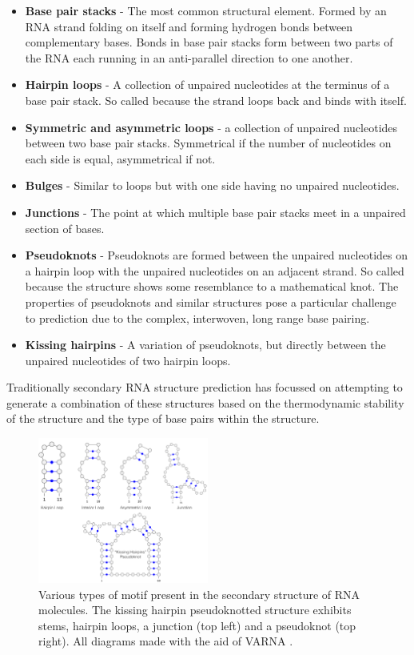 \documentclass[journal]{IEEEtran}
\begin{document}
\begin{itemize}
	\item \textbf{Base pair stacks} - The most common structural element. Formed by an RNA strand folding on itself and forming hydrogen bonds between complementary bases. Bonds in base pair stacks form between two parts of the RNA each running in an anti-parallel direction to one another. 
	\item \textbf{Hairpin loops} - A collection of unpaired nucleotides at the terminus of a base pair stack. So called because the strand loops back and binds with itself.
	\item \textbf{Symmetric and asymmetric loops} - a collection of unpaired nucleotides between two base pair stacks. Symmetrical if the number of nucleotides on each side is equal, asymmetrical if not.
	\item \textbf{Bulges} - Similar to loops but with one side having no unpaired nucleotides.
	\item \textbf{Junctions} - The point at which multiple base pair stacks meet in a unpaired section of bases.
	\item \textbf{Pseudoknots} - Pseudoknots are formed between the unpaired nucleotides on a hairpin loop with the unpaired nucleotides on an adjacent strand. So called because the structure shows some resemblance to a mathematical knot. The properties of pseudoknots and similar structures pose a particular challenge to prediction due to the complex, interwoven, long range base pairing.
	\item \textbf{Kissing hairpins} - A variation of pseudoknots, but directly between the unpaired nucleotides of two hairpin loops.
\end{itemize}

Traditionally secondary RNA structure prediction has focussed on attempting to generate a combination of these structures based on the thermodynamic stability of the structure and the type of base pairs within the structure.

\begin{figure}[t]
\centering
\includegraphics[width=0.5\textwidth]{img/secondary_structure_types.png}
\caption{Various types of motif present in the secondary structure of RNA molecules. The kissing hairpin pseudoknotted structure exhibits stems, hairpin loops, a junction (top left) and a pseudoknot (top right). All diagrams made with the aid of VARNA \cite{darty2009varna}.}
\label{fig:secondary-structure-types}
\end{figure}
\end{document}
